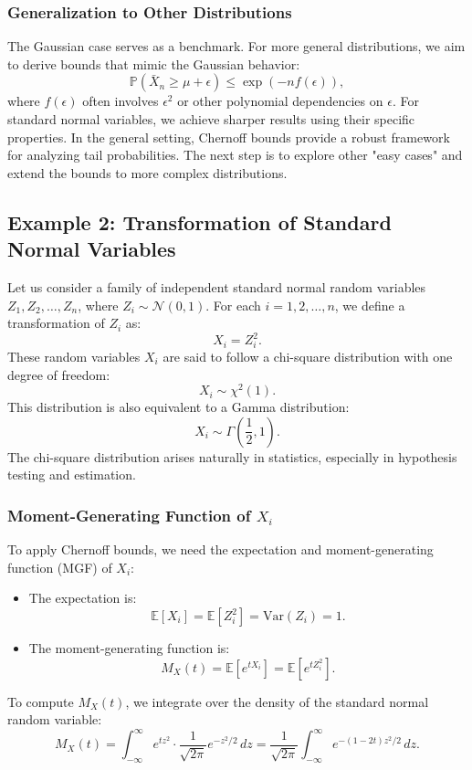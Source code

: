 \subsubsection{Generalization to Other Distributions}
The Gaussian case serves as a benchmark. For more general distributions, we aim to derive bounds that mimic the Gaussian behavior:
\[
\mathbb{P}(\bar{X}_n \geq \mu + \epsilon) \leq \exp\left(-n f(\epsilon)\right),
\]
where \( f(\epsilon) \) often involves \( \epsilon^2 \) or other polynomial dependencies on \( \epsilon \). \newline
For standard normal variables, we achieve sharper results using their specific properties. In the general setting, Chernoff bounds provide a robust framework for analyzing tail probabilities. The next step is to explore other "easy cases" and extend the bounds to more complex distributions.

\subsection{Example 2: Transformation of Standard Normal Variables}

Let us consider a family of independent standard normal random variables \( Z_1, Z_2, \ldots, Z_n \), where \( Z_i \sim \mathcal{N}(0, 1) \). For each \( i = 1, 2, \ldots, n \), we define a transformation of \( Z_i \) as:
\[
X_i = Z_i^2.
\]
These random variables \( X_i \) are said to follow a chi-square distribution with one degree of freedom:
\[
X_i \sim \chi^2(1).
\]
This distribution is also equivalent to a Gamma distribution:
\[
X_i \sim \Gamma\left(\frac{1}{2}, 1\right).
\]
The chi-square distribution arises naturally in statistics, especially in hypothesis testing and estimation.

\subsubsection{Moment-Generating Function of \( X_i \)}
To apply Chernoff bounds, we need the expectation and moment-generating function (MGF) of \( X_i \):
\begin{itemize}
    \item The expectation is:
    \[
    \mathbb{E}[X_i] = \mathbb{E}[Z_i^2] = \text{Var}(Z_i) = 1.
    \]
    \item The moment-generating function is:
    \[
    M_X(t) = \mathbb{E}[e^{t X_i}] = \mathbb{E}[e^{t Z_i^2}].
    \]
\end{itemize}
To compute \( M_X(t) \), we integrate over the density of the standard normal random variable:
\[
M_X(t) = \int_{-\infty}^{\infty} e^{t z^2} \cdot \frac{1}{\sqrt{2\pi}} e^{-z^2 / 2} \, dz = \frac{1}{\sqrt{2\pi}} \int_{-\infty}^\infty e^{-(1 - 2t)z^2 / 2} \, dz.
\]

